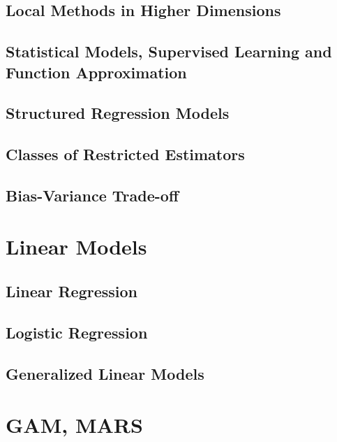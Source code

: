 \documentclass[12pt]{article}
\begin{document}
\subsection{Local Methods in Higher Dimensions}

\subsection{Statistical Models, Supervised Learning and Function Approximation}
\subsection{Structured Regression Models}
\subsection{Classes of Restricted Estimators}
\subsection{Bias-Variance Trade-off}




\newpage 


\section{Linear Models}
\subsection{Linear Regression}
\subsection{Logistic Regression}
\subsection{Generalized Linear Models}

\newpage

\section{GAM, MARS}
\end{document}
